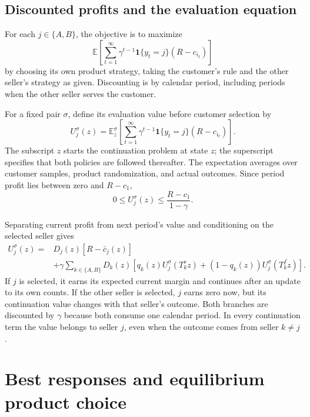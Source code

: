 \documentclass[11pt]{article}
\newcommand{\E}{\mathbb E}
\newcommand{\Ind}[1]{\mathbf 1\{#1\}}
\begin{document}
\subsection{Discounted profits and the evaluation equation}

For each $j\in\{A,B\}$, the objective is to maximize
\begin{equation}\label{eq:objective}
\E\left[\sum_{t=1}^{\infty}\gamma^{t-1}
\Ind{y_t=j}(R-c_{i_t})\right]
\end{equation}
by choosing its own product strategy, taking the customer's rule and
the other seller's strategy as given. Discounting is by calendar period,
including periods when the other seller serves the customer.

For a fixed pair $\sigma$, define its evaluation value before customer
selection by
\begin{equation}\label{eq:fixed-value}
U_j^\sigma(z)=\E_z^\sigma\left[
\sum_{t=1}^{\infty}\gamma^{t-1}\Ind{y_t=j}(R-c_{i_t})\right].
\end{equation}
The subscript $z$ starts the continuation problem at state $z$; the
superscript specifies that both policies are followed thereafter.
The expectation averages over customer samples, product randomization,
and actual outcomes. Since period profit lies between zero and $R-c_1$,
\begin{equation}\label{eq:value-bound}
0\leq U_j^\sigma(z)\leq\frac{R-c_1}{1-\gamma}.
\end{equation}

Separating current profit from next period's value and conditioning on
the selected seller gives
\begin{equation}\label{eq:policy-evaluation}
\boxed{\begin{aligned}
U_j^\sigma(z)={}&D_j(z)[R-\bar c_j(z)]\\
&+\gamma\sum_{k\in\{A,B\}}D_k(z)
\left[q_k(z)U_j^\sigma(T_k^s z)
+(1-q_k(z))U_j^\sigma(T_k^f z)\right].
\end{aligned}}
\end{equation}
If $j$ is selected, it earns its expected current margin and continues
after an update to its own counts. If the other seller is selected,
$j$ earns zero now, but its continuation value changes with that
seller's outcome. Both branches are discounted by $\gamma$ because
both consume one calendar period. In every continuation term the value
belongs to seller $j$, even when the outcome comes from seller $k\ne j$.

\section{Best responses and equilibrium product choice}
\end{document}
